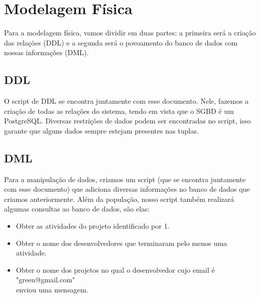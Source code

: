 \documentclass{article}
\begin{document}
\section{Modelagem Física}
	Para a modelagem física, vamos dividir em duas partes: a primeira será a criação das relações (DDL) e a segunda será o povoamento do banco de dados com nossas informações (DML).
	\subsection{DDL}
		O script de DDL se encontra juntamente com esse documento. Nele, fazemos a criação de todas as relações do sistema, tendo em vista que o SGBD é um PostgreSQL. Diversas restrições de dados podem ser encontradas no script, isso garante que alguns dados sempre estejam presentes nas tuplas.

	\subsection{DML}
		Para a manipulação de dados, criamos um script (que se encontra juntamente com esse documento) que adiciona diversas informações no banco de dados que criamos anteriormente. Além da população, nosso script também realizará algumas consultas ao banco de dados, são elas:
		\begin{itemize}
			\item Obter as atividades do projeto identificado por 1.

			\item Obter o nome dos desenvolvedores que terminaram pelo menos uma atividade.

			\item Obter o nome dos projetos no qual o desenvolvedor cujo email é "green@gmail.com"\\ enviou uma mensagem.

		\end{itemize}
\end{document}

